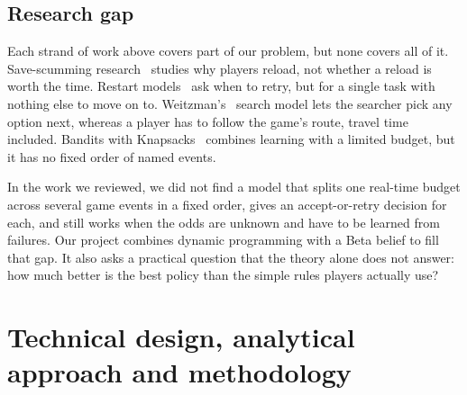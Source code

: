 \documentclass[11pt,a4paper]{article}
\newcommand{\who}[1]{}
\begin{document}
\subsection{Research gap\who{Daniel}}
Each strand of work above covers part of our problem, but none covers all of it. Save-scumming research~\cite{farmer2024,farmer2025,farmer2026} studies why players reload, not whether a reload is worth the time. Restart models~\cite{luby1993,lorenz2016} ask when to retry, but for a single task with nothing else to move on to. Weitzman's~\cite{weitzman1979} search model lets the searcher pick any option next, whereas a player has to follow the game's route, travel time included. Bandits with Knapsacks~\cite{badanidiyuru2018} combines learning with a limited budget, but it has no fixed order of named events.

In the work we reviewed, we did not find a model that splits one real-time budget across several game events in a fixed order, gives an accept-or-retry decision for each, and still works when the odds are unknown and have to be learned from failures. Our project combines dynamic programming with a Beta belief to fill that gap. It also asks a practical question that the theory alone does not answer: how much better is the best policy than the simple rules players actually use?

\section{Technical design, analytical approach and methodology}
\end{document}
